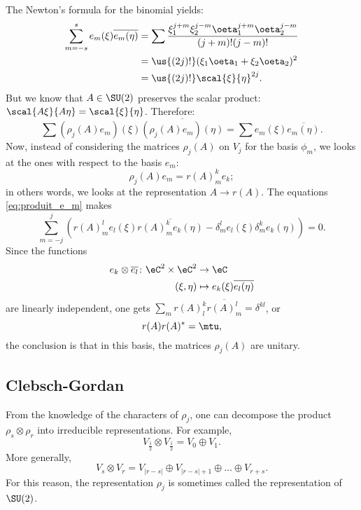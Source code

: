 The Newton's formula for the binomial yields: 
\begin{equation}
\begin{split}
  \sum_{m=-s}^s e_m(\xi)\overline{e_m(\eta)}
        &=\sum\frac{ \xi_1^{j+m}\xi_2^{j-m}\oeta_1^{j+m}\oeta_2^{j-m} }{(j+m)!(j-m)!}\\
	&=\us{(2j)!}(\xi_1\oeta_1+\xi_2\oeta_2)^2\\
	&=\us{(2j)!}\scal{\xi}{\eta}^{2j}.
\end{split}
\end{equation}
But we know that $A\in\SU(2)$ preserves the scalar product: $\scal{A\xi}{A\eta}=\scal{\xi}{\eta}$. Therefore:
\begin{equation}\label{eq:produit_e_m}
\sum (\rho_j(A)e_m)(\xi)\overline{ (\rho_j(A)e_m)(\eta) }=\sum e_m(\xi)\overline{e_m(\eta)}.
\end{equation}
Now, instead of considering the matrices $\rho_j(A)$ on $V_j$ for the basis $\phi_m$, we looks at the ones with respect to the basis $e_m$:
\begin{equation}
\rho_j(A)e_m=r(A)^k_me_k;
\end{equation}
in others words, we looks at the representation $A\to r(A)$. The equations \eqref{eq:produit_e_m} makes
\[
  \sum_{m=-j}^j\left(
                      r(A)^l_me_l(\xi)\overline{ r(A)^k_me_k(\eta)   }
		        -\delta^l_me_l(\xi)\delta^k_me_k(\eta)
                \right)=0.
\]
Since the functions
\begin{equation}
\begin{aligned}
 e_k\otimes\overline{e_l}\colon \eC^2\times\eC^2 &\to \eC \\
(\xi,\eta) &\mapsto  e_k(\xi)\overline{e_l(\eta)}
\end{aligned}
\end{equation}
 are linearly independent, one gets $\sum_m r(A)^k_l\overline{r(A)^l_m}=\delta^{kl}$, or
\begin{equation}
r(A)r(A)^*=\mtu,
\end{equation}
the conclusion is that in this basis, the matrices $\rho_j(A)$ are unitary.

\subsection{Clebsch-Gordan}

From the knowledge of the characters of $\rho_j$, one can decompose the product $\rho_s\otimes\rho_r$ into irreducible representations. For example,
\[
   V_{\frac{1}{2}}\otimes V_{\frac{1}{2}}=V_0\oplus V_1.
\]
More generally,
\begin{equation}
  V_s\otimes V_r=V_{|r-s|} \oplus V_{|r-s|+1}\oplus\ldots\oplus V_{r+s}.
\end{equation}
For this reason, the representation $\rho_j$ is sometimes called the  representation of $\SU(2)$.

